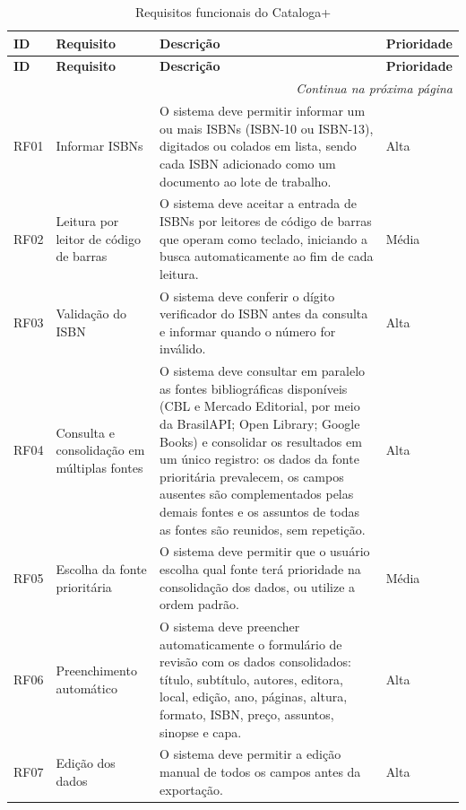 \begin{longtable}{|p{}|p{}|p{}|p{}|}
    \caption{Requisitos funcionais do Cataloga+}
    \label{qua:rf} \\
    \hline
    \textbf{ID} & \textbf{Requisito} & \textbf{Descrição} & \textbf{Prioridade} \\ \hline
    \endfirsthead
    \hline
    \textbf{ID} & \textbf{Requisito} & \textbf{Descrição} & \textbf{Prioridade} \\ \hline
    \endhead
    \hline \multicolumn{4}{r}{\textit{Continua na próxima página}} \\
    \endfoot
    \hline
    \endlastfoot

    RF01 & Informar ISBNs & O sistema deve permitir informar um ou mais ISBNs (ISBN-10 ou ISBN-13), digitados ou colados em lista, sendo cada ISBN adicionado como um documento ao lote de trabalho. & Alta \\ \hline
    RF02 & Leitura por leitor de código de barras & O sistema deve aceitar a entrada de ISBNs por leitores de código de barras que operam como teclado, iniciando a busca automaticamente ao fim de cada leitura. & Média \\ \hline
    RF03 & Validação do ISBN & O sistema deve conferir o dígito verificador do ISBN antes da consulta e informar quando o número for inválido. & Alta \\ \hline
    RF04 & Consulta e consolidação em múltiplas fontes & O sistema deve consultar em paralelo as fontes bibliográficas disponíveis (CBL e Mercado Editorial, por meio da BrasilAPI; Open Library; Google Books) e consolidar os resultados em um único registro: os dados da fonte prioritária prevalecem, os campos ausentes são complementados pelas demais fontes e os assuntos de todas as fontes são reunidos, sem repetição. & Alta \\ \hline
    RF05 & Escolha da fonte prioritária & O sistema deve permitir que o usuário escolha qual fonte terá prioridade na consolidação dos dados, ou utilize a ordem padrão. & Média \\ \hline
    RF06 & Preenchimento automático & O sistema deve preencher automaticamente o formulário de revisão com os dados consolidados: título, subtítulo, autores, editora, local, edição, ano, páginas, altura, formato, ISBN, preço, assuntos, sinopse e capa. & Alta \\ \hline
    RF07 & Edição dos dados & O sistema deve permitir a edição manual de todos os campos antes da exportação. & Alta \\ \hline

\end{longtable}
